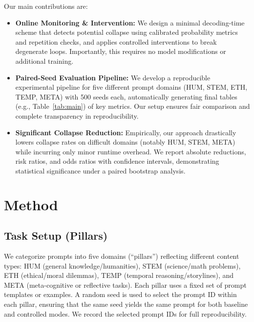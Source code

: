 \documentclass{article}
\begin{document}
Our main contributions are:
\begin{itemize}
  \item \textbf{Online Monitoring \& Intervention:} We design a minimal decoding-time scheme that detects potential collapse using calibrated probability metrics and repetition checks, and applies controlled interventions to break degenerate loops. Importantly, this requires no model modifications or additional training.
  \item \textbf{Paired-Seed Evaluation Pipeline:} We develop a reproducible experimental pipeline for five different prompt domains (HUM, STEM, ETH, TEMP, META) with 500 seeds each, automatically generating final tables (e.g., Table~\ref{tab:main}) of key metrics. Our setup ensures fair comparison and complete transparency in reproducibility.
  \item \textbf{Significant Collapse Reduction:} Empirically, our approach drastically lowers collapse rates on difficult domains (notably HUM, STEM, META) while incurring only minor runtime overhead. We report absolute reductions, risk ratios, and odds ratios with confidence intervals, demonstrating statistical significance under a paired bootstrap analysis.
\end{itemize}

\section{Method}
\subsection{Task Setup (Pillars)}
We categorize prompts into five domains (``pillars'') reflecting different content types: HUM (general knowledge/humanities), STEM (science/math problems), ETH (ethical/moral dilemmas), TEMP (temporal reasoning/storylines), and META (meta-cognitive or reflective tasks). Each pillar uses a fixed set of prompt templates or examples. A random seed is used to select the prompt ID within each pillar, ensuring that the same seed yields the same prompt for both baseline and controlled modes. We record the selected prompt IDs for full reproducibility.
\end{document}
